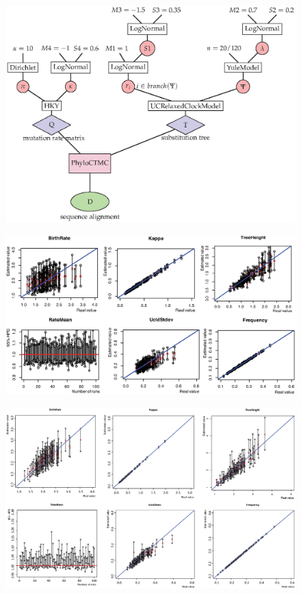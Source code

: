 \documentclass{bmcart}
\begin{document}
\begin{backmatter}
\begin{figure}[h!]
\includegraphics[width=12cm]{ModelValidation.eps}\\
\caption{
             }
\label{modelvalidation}
\end{figure}

\begin{figure}[h!]
\includegraphics[width=12cm]{SmallTree.eps}\\
\caption{
             }
\label{SmallTree}
\end{figure}

\begin{figure}[h!]
\includegraphics[width=12cm]{LargeTree.eps}\\
\caption{
             }
\label{LargeTree}
\end{figure}


\end{backmatter}
\end{document}
